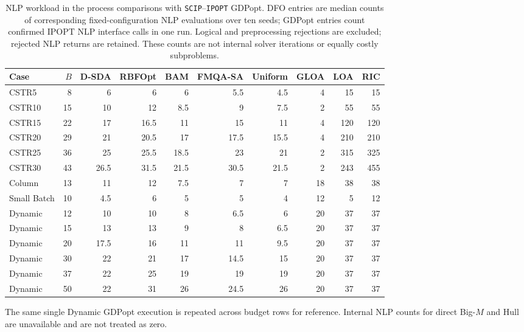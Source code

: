 \begin{table}[htbp]\centering\small
\caption{NLP workload in the process comparisons with \texttt{SCIP}--\texttt{IPOPT} GDPopt.
DFO entries are median counts of corresponding fixed-configuration NLP evaluations over ten seeds; GDPopt entries count confirmed IPOPT NLP interface calls in one run.
Logical and preprocessing rejections are excluded; rejected NLP returns are retained.
These counts are not internal solver iterations or equally costly subproblems.}
\label{tab:joint-nlp-workload}
\setlength{\tabcolsep}{3.5pt}
\begin{tabular}{lrrrrrrrrr}\toprule
Case & \(B\) & D-SDA & RBFOpt & BAM & FMQA-SA & Uniform & GLOA & LOA & RIC\\\midrule
CSTR5 & 8 & 6 & 6 & 6 & 5.5 & 4.5 & 4 & 15 & 15 \\
CSTR10 & 15 & 10 & 12 & 8.5 & 9 & 7.5 & 2 & 55 & 55 \\
CSTR15 & 22 & 17 & 16.5 & 11 & 15 & 11 & 4 & 120 & 120 \\
CSTR20 & 29 & 21 & 20.5 & 17 & 17.5 & 15.5 & 4 & 210 & 210 \\
CSTR25 & 36 & 25 & 25.5 & 18.5 & 23 & 21 & 2 & 315 & 325 \\
CSTR30 & 43 & 26.5 & 31.5 & 21.5 & 30.5 & 21.5 & 2 & 243 & 455 \\
Column & 13 & 11 & 12 & 7.5 & 7 & 7 & 18 & 38 & 38 \\
Small Batch & 10 & 4.5 & 6 & 5 & 5 & 4 & 12 & 5 & 12 \\
Dynamic & 12 & 10 & 10 & 8 & 6.5 & 6 & 20 & 37 & 37 \\
Dynamic & 15 & 13 & 13 & 9 & 8 & 6.5 & 20 & 37 & 37 \\
Dynamic & 20 & 17.5 & 16 & 11 & 11 & 9.5 & 20 & 37 & 37 \\
Dynamic & 30 & 22 & 21 & 17 & 14.5 & 15 & 20 & 37 & 37 \\
Dynamic & 37 & 22 & 25 & 19 & 19 & 19 & 20 & 37 & 37 \\
Dynamic & 50 & 22 & 31 & 26 & 24.5 & 26 & 20 & 37 & 37 \\
\bottomrule\end{tabular}
\par\smallskip
\begin{minipage}{0.98\linewidth}\footnotesize
The same single Dynamic GDPopt execution is repeated across budget rows for reference.
Internal NLP counts for direct Big-\(M\) and Hull are unavailable and are not treated as zero.
\end{minipage}
\end{table}
\FloatBarrier


